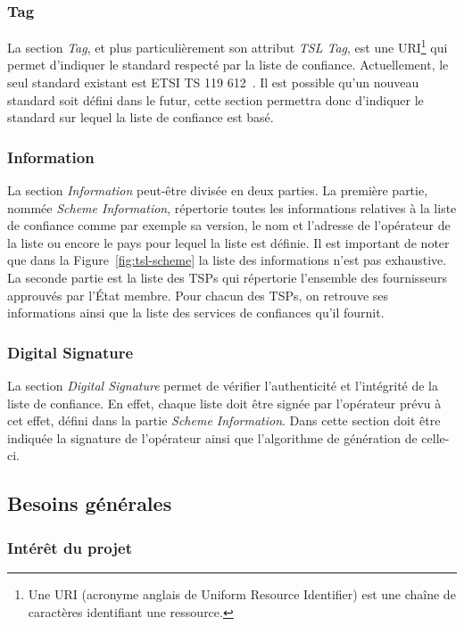 \documentclass{tnreport}
\begin{document}
\subsubsection{Tag}

La section \textit{Tag}, et plus particulièrement son attribut \textit{TSL Tag}, est une URI\footnote{Une URI (acronyme anglais de Uniform Resource Identifier) est une chaîne de caractères identifiant une ressource.} qui permet d'indiquer le standard respecté par la liste de confiance. Actuellement, le seul standard  existant est ETSI TS 119 612~\cite{ETSITS119612}. Il est possible qu'un nouveau standard soit défini dans le futur, cette section permettra donc d'indiquer le standard sur lequel la liste de confiance est basé.

\subsubsection{Information}

La section \textit{Information} peut-être divisée en deux parties. 
La première partie, nommée \textit{Scheme Information}, répertorie toutes les informations relatives à la liste de confiance comme par exemple sa version, le nom et l'adresse de l'opérateur de la liste ou encore le pays pour lequel la liste est définie. Il est important de noter que dans la Figure~\ref{fig:tsl-scheme} la liste des informations n'est pas exhaustive. 
La seconde partie est la liste des TSPs qui répertorie l'ensemble des fournisseurs approuvés par l'État membre. Pour chacun des TSPs, on retrouve ses informations ainsi que la liste des services de confiances qu'il fournit.

\subsubsection{Digital Signature}

La section \textit{Digital Signature} permet de vérifier l'authenticité et l'intégrité de la liste de confiance. En effet, chaque liste doit être signée par l'opérateur prévu à cet effet, défini dans la partie \textit{Scheme Information}. Dans cette section doit être indiquée la signature de l'opérateur ainsi que l'algorithme de génération de celle-ci.

\subsection{Besoins générales}

\subsubsection{Intérêt du projet}
\end{document}
